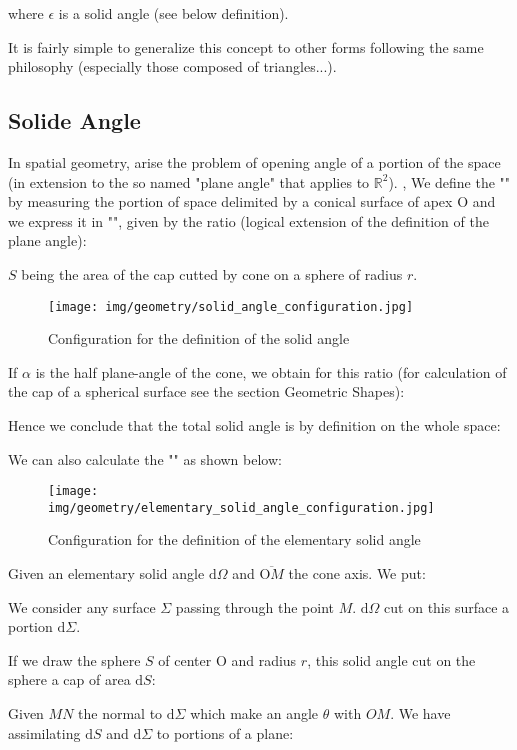 	where $\epsilon$ is a solid angle (see below definition).
	
	It is fairly simple to generalize this concept to other forms following the same philosophy (especially those composed of triangles...).
	
	\subsection{Solide Angle}
	In spatial geometry, arise the problem of opening angle of a portion of the space (in extension to the so named "plane angle" that applies to $\mathbb{R}^2$). , We define the "" by measuring the portion of space delimited by a conical surface of apex $\text{O}$ and we express it in "", given by the ratio (logical extension of the definition of the plane angle):
	
	$S$ being the area of the cap cutted by cone on a sphere of radius $r$.
	
	\begin{figure}[H]
		\centering
		\texttt{[image: img/geometry/solid\_angle\_configuration.jpg]}
		\caption{Configuration for the definition of the solid angle}
	\end{figure}
	If $\alpha$ is the half plane-angle of the cone, we obtain for this ratio (for calculation of the cap of a spherical surface see the section Geometric Shapes):
	
	Hence we conclude that the total solid angle is by definition on the whole space:
	
	We can also calculate the "" as shown below:
	\begin{figure}[H]
		\centering
		\texttt{[image: img/geometry/elementary\_solid\_angle\_configuration.jpg]}
		\caption{Configuration for the definition of the elementary solid angle}
	\end{figure}
	Given an elementary solid angle $\mathrm{d}\Omega$ and $\overline{\text{O}M}$ the cone axis. We put:
	
	We consider any surface $\Sigma$ passing through the point $M$. $\mathrm{d}\Omega$ cut on this surface a portion $\mathrm{d}\Sigma$.
	
	If we draw the sphere $S$ of center $\text{O}$ and radius $r$, this solid angle cut on the sphere a cap of area $\mathrm{d}S$:
	
	Given $MN$ the normal to $\mathrm{d}\Sigma$ which make an angle $\theta$ with $OM$. We have assimilating $\mathrm{d}S$ and $\mathrm{d}\Sigma$ to portions of a plane:
	
